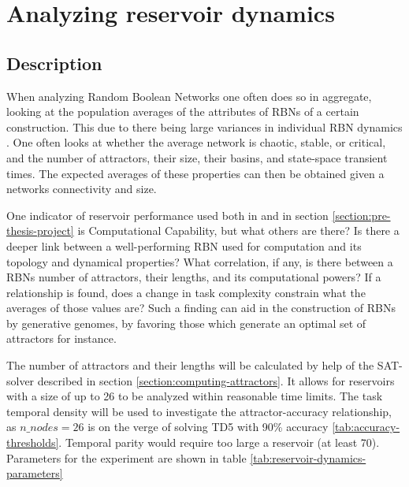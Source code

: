 \section{Analyzing reservoir dynamics}
\label{section:reservoir-dynamics}

\subsection{Description}

When analyzing Random Boolean Networks one often does so in aggregate,
looking at the population averages of the attributes of RBNs of a certain construction.
This due to there being large variances in individual RBN dynamics \cite{gershenson2004introduction}.
One often looks at whether the average network is chaotic, stable, or critical,
and the number of attractors, their size, their basins, and state-space transient times.
The expected averages of these properties can then be obtained given a networks connectivity and size.

One indicator of reservoir performance used both in \cite{rbn-reservoir} and in section \ref{section:pre-thesis-project} is Computational Capability,
but what others are there?
Is there a deeper link between a well-performing RBN used for computation and its topology and dynamical properties?
What correlation, if any, is there between a RBNs number of attractors, their lengths, and its computational powers?
If a relationship is found, does a change in task complexity constrain what the averages of those values are?
Such a finding can aid in the construction of RBNs by generative genomes,
by favoring those which generate an optimal set of attractors for instance.

The number of attractors and their lengths will be calculated by help of the SAT-solver described in section \ref{section:computing-attractors}.
It allows for reservoirs with a size of up to 26 to be analyzed within reasonable time limits.
The task temporal density will be used to investigate the attractor-accuracy relationship,
as $ n\_nodes = 26 $ is on the verge of solving TD5 with 90\% accuracy \ref{tab:accuracy-thresholds}.
Temporal parity would require too large a reservoir (at least 70).
Parameters for the experiment are shown in table \ref{tab:reservoir-dynamics-parameters}

